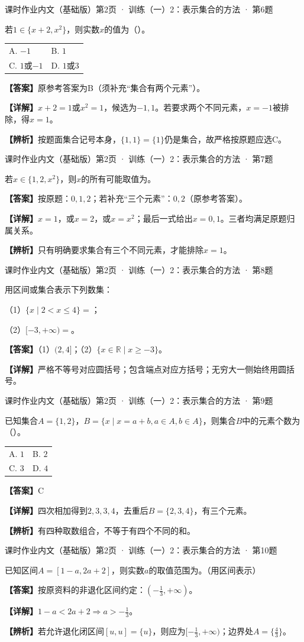 \documentclass[UTF8,10pt,aspectratio=169]{ctexbeamer}
\makeatletter
\newcommand{\Answer}[1]{\par\vspace{0.2cm}\textbf{【答案】}#1}
\newcommand{\Analysis}[1]{\par\vspace{0.2cm}\textbf{【详解】}#1}
\newcommand{\Choices}[4]{\par\vspace{0.2cm}\begin{tabular}{@{}p{0.47\textwidth}p{0.47\textwidth}@{}}A. #1 & B. #2 \\[0.15cm] C. #3 & D. #4\end{tabular}}
\newcommand{\R}{\mathbb R}
\newcommand{\blank}{\underline{\hspace{1.6cm}}}
\newcommand{\Tip}[1]{\par\vspace{0.2cm}\textbf{【辨析】}#1}
\newcommand{\Source}[1]{{\scriptsize\color{gray}#1}\par\vspace{0.25cm}}
\makeatother
\begin{document}
\begin{frame}
\Source{课时作业内文（基础版）第2页 · 训练（一）2：表示集合的方法 · 第6题}
若$1\in\{x+2,x^2\}$，则实数$x$的值为（\quad）。
\Choices{$-1$}{$1$}{$1$或$-1$}{$1$或$3$}
\pause
\Answer{原参考答案为B（须补充“集合有两个元素”）。}
\Analysis{$x+2=1$或$x^2=1$，候选为$-1,1$。若要求两个不同元素，$x=-1$被排除，得$x=1$。}
\Tip{按题面集合记号本身，$\{1,1\}=\{1\}$仍是集合，故严格按原题应选C。}
\end{frame}
\begin{frame}
\Source{课时作业内文（基础版）第2页 · 训练（一）2：表示集合的方法 · 第7题}
若$x\in\{1,2,x^2\}$，则$x$的所有可能取值为\blank。
\pause
\Answer{按原题：$0,1,2$；若补充“三个元素”：$0,2$（原参考答案）。}
\Analysis{$x=1$，或$x=2$，或$x=x^2$；最后一式给出$x=0,1$。三者均满足原题归属关系。}
\Tip{只有明确要求集合有三个不同元素，才能排除$x=1$。}
\end{frame}
\begin{frame}
\Source{课时作业内文（基础版）第2页 · 训练（一）2：表示集合的方法 · 第8题}
用区间或集合表示下列数集：
\par （1）$\{x\mid2<x\le4\}=$\blank；
\par （2）$[-3,+\infty)=$\blank。
\pause
\Answer{（1）$(2,4]$；（2）$\{x\in\R\mid x\ge-3\}$。}
\Analysis{严格不等号对应圆括号；包含端点对应方括号；无穷大一侧始终用圆括号。}
\end{frame}
\begin{frame}
\Source{课时作业内文（基础版）第2页 · 训练（一）2：表示集合的方法 · 第9题}
已知集合$A=\{1,2\}$，$B=\{x\mid x=a+b,a\in A,b\in A\}$，则集合$B$中的元素个数为（\quad）。
\Choices{$1$}{$2$}{$3$}{$4$}
\pause
\Answer{C}
\Analysis{四次相加得到$2,3,3,4$，去重后$B=\{2,3,4\}$，有三个元素。}
\Tip{有四种取数组合，不等于有四个不同的和。}
\end{frame}
\begin{frame}
\Source{课时作业内文（基础版）第2页 · 训练（一）2：表示集合的方法 · 第10题}
已知区间$A=[1-a,2a+2]$，则实数$a$的取值范围为\blank。（用区间表示）
\pause
\Answer{按原资料的非退化区间约定：$(-\frac13,+\infty)$。}
\Analysis{$1-a<2a+2\Rightarrow a>-\frac13$。}
\Tip{若允许退化闭区间$[u,u]=\{u\}$，则应为$[-\frac13,+\infty)$；边界处$A=\{\frac43\}$。}
\end{frame}
\end{document}

